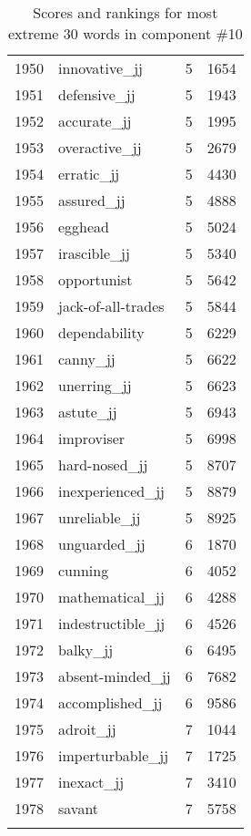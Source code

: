 \begin{longtable}[!htbp]{| rlr@{.}l |}
    1950 & innovative\_jj & 5 & 1654 \\
    1951 & defensive\_jj & 5 & 1943 \\
    1952 & accurate\_jj & 5 & 1995 \\
    1953 & overactive\_jj & 5 & 2679 \\
    1954 & erratic\_jj & 5 & 4430 \\
    1955 & assured\_jj & 5 & 4888 \\
    1956 & egghead & 5 & 5024 \\
    1957 & irascible\_jj & 5 & 5340 \\
    1958 & opportunist & 5 & 5642 \\
    1959 & jack-of-all-trades & 5 & 5844 \\
    1960 & dependability & 5 & 6229 \\
    1961 & canny\_jj & 5 & 6622 \\
    1962 & unerring\_jj & 5 & 6623 \\
    1963 & astute\_jj & 5 & 6943 \\
    1964 & improviser & 5 & 6998 \\
    1965 & hard-nosed\_jj & 5 & 8707 \\
    1966 & inexperienced\_jj & 5 & 8879 \\
    1967 & unreliable\_jj & 5 & 8925 \\
    1968 & unguarded\_jj & 6 & 1870 \\
    1969 & cunning & 6 & 4052 \\
    1970 & mathematical\_jj & 6 & 4288 \\
    1971 & indestructible\_jj & 6 & 4526 \\
    1972 & balky\_jj & 6 & 6495 \\
    1973 & absent-minded\_jj & 6 & 7682 \\
    1974 & accomplished\_jj & 6 & 9586 \\
    1975 & adroit\_jj & 7 & 1044 \\
    1976 & imperturbable\_jj & 7 & 1725 \\
    1977 & inexact\_jj & 7 & 3410 \\
    1978 & savant & 7 & 5758 \\
    \hline
    \caption{Scores and rankings for most extreme 30 words in component \#10} \\
\end{longtable}
